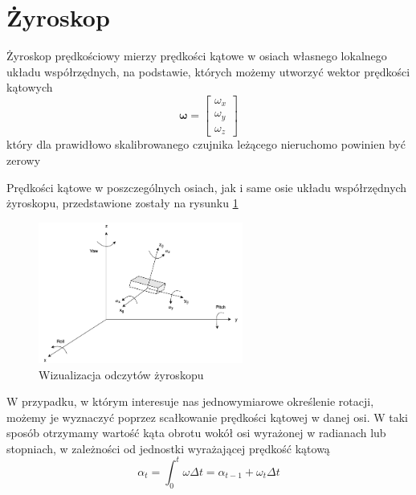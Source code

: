 \section{Żyroskop}

Żyroskop prędkościowy mierzy prędkości kątowe w osiach własnego lokalnego układu współrzędnych, na podstawie, których możemy utworzyć wektor prędkości kątowych
$$
    \mathbf{\omega} = 
    \left[
    \begin{array}{c}
        \omega_x \\
        \omega_y \\
        \omega_z
    \end{array}
    \right]
$$
który dla prawidłowo skalibrowanego czujnika leżącego nieruchomo powinien być zerowy

Prędkości kątowe w poszczególnych osiach, jak i same osie układu współrzędnych żyroskopu, przedstawione zostały na rysunku \ref{Zyroskop oznaczenia}

\begin{figure}
    \centering
    \includegraphics[width=0.6\textwidth]{Rysunki/Rozdzial03/Zyroskop.png}
    \caption{Wizualizacja odczytów żyroskopu}
    \label{Zyroskop oznaczenia}
\end{figure}

\newpage

W przypadku, w którym interesuje nas jednowymiarowe określenie rotacji, możemy je wyznaczyć poprzez scałkowanie prędkości kątowej w danej osi. W taki sposób otrzymamy wartość kąta obrotu wokół osi wyrażonej w radianach lub stopniach, w zależności od jednostki wyrażającej prędkość kątową \cite{Akwizycja}
$$
    \alpha_t = \int_{0}^{t} \omega \Delta t = \alpha_{t-1} + \omega_t \Delta t
$$

